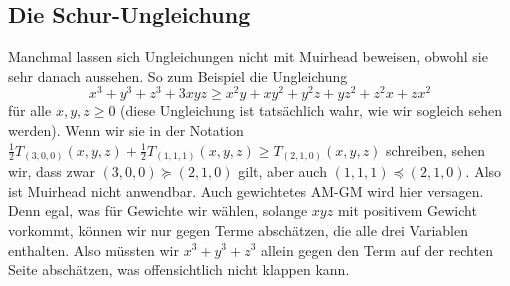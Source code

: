 \subsection*{Die Schur-Ungleichung}
Manchmal lassen sich Ungleichungen nicht mit Muirhead beweisen, obwohl sie sehr danach aussehen. So zum Beispiel die Ungleichung
\begin{equation*}
	x^3+y^3+z^3+3xyz\geqslant x^2y+xy^2+y^2z+yz^2+z^2x+zx^2
\end{equation*}
für alle $x,y,z\geqslant 0$ (diese Ungleichung ist tatsächlich wahr, wie wir sogleich sehen werden). Wenn wir sie in der Notation $\frac 12T_{(3,0,0)}(x,y,z)+\frac12 T_{(1,1,1)}(x,y,z)\geqslant T_{(2,1,0)}(x,y,z)$ schreiben, sehen wir, dass zwar $(3,0,0)\succcurlyeq (2,1,0)$ gilt, aber auch $(1,1,1)\preccurlyeq (2,1,0)$. Also ist Muirhead nicht anwendbar. Auch gewichtetes AM-GM wird hier versagen. Denn egal, was für Gewichte wir wählen, solange $xyz$ mit positivem Gewicht vorkommt, können wir nur gegen Terme abschätzen, die alle drei Variablen enthalten. Also müssten wir $x^3+y^3+z^3$ allein gegen den Term auf der rechten Seite abschätzen, was offensichtlich nicht klappen kann.

